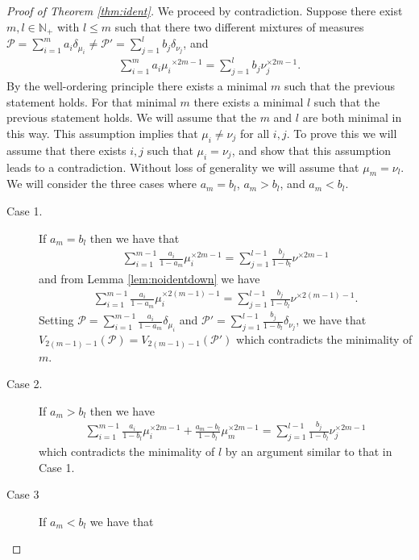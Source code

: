 \documentclass[aos,preprint]{imsart}
\def\sP{\mathscr{P}}
\theoremstyle{plain}
\theoremstyle{defintion}
\begin{document}
	\begin{proof}[Proof of Theorem \ref{thm:ident}]
		We proceed by contradiction. Suppose there exist $m,l\in \mathbb{N}_+$ with $l\le m$ such that there two different mixtures of measures $\sP = \sum_{i=1}^m a_i\delta_{\mu_i}  \neq \sP' = \sum_{j=1}^l b_j\delta_{\nu_j}$, and
		\begin{eqnarray} 
			\sum_{i=1}^{m} a_i {\mu_i}^{\times 2m-1} = \sum_{j=1}^{l} b_j {\nu}_j^{\times 2m-1}. \label{grr}
		\end{eqnarray}
		By the well-ordering principle there exists a minimal $m$ such that the previous statement holds. For that minimal $m$ there exists a minimal $l$ such that the previous statement holds. We will assume that the $m$ and $l$ are both minimal in this way. This assumption implies that $\mu_i\neq \nu_j$ for all $i,j$. To prove this we will assume that there exists $i,j$ such that $\mu_i = \nu_j$, and show that this assumption leads to a contradiction. Without loss of generality we will assume that $\mu_m = \nu_l$. We will consider the three cases where $a_m=b_l$, $a_m>b_l$, and $a_m<b_l$.
		\begin{description}	
			\item[Case 1.] If $a_m = b_l$ then we have that
				\begin{eqnarray*}
					\sum_{i = 1}^{m-1}\frac{a_i}{1-a_m} \mu_i^{\times 2m-1} = \sum_{j=1}^{l-1}\frac{b_j}{1-b_l}\nu^{\times 2m-1}
				\end{eqnarray*}
				and from Lemma \ref{lem:noidentdown} we have
				\begin{eqnarray*}
					\sum_{i = 1}^{m-1}\frac{a_i}{1-a_m} \mu_i^{\times 2(m-1)-1} = \sum_{j=1}^{l-1}\frac{b_j}{1-b_l}\nu^{\times 2(m-1)-1}.
				\end{eqnarray*}
				Setting $\sP = \sum_{i=1}^{m-1} \frac{a_i}{1-a_m} \delta_{\mu_i}$ and $\sP' = \sum_{j=1}^{l-1} \frac{b_j}{1-b_l} \delta_{\nu_j}$, we have that $V_{2\left( m-1 \right) - 1} \left( \sP \right) = V_{2\left( m-1 \right)-1}\left( \sP' \right)$ which contradicts the minimality of $m$.
			\item[Case 2.]If $a_m >b_l$ then we have
				\begin{eqnarray*}
					\sum_{i=1}^{m-1} \frac{a_i}{1-b_l} \mu_i^{\times 2m-1} + \frac{a_m - b_l}{1-b_l}\mu_m^{\times 2m-1} = \sum_{j=1}^{l-1} \frac{b_j}{1-b_l}\nu_j^{\times 2m-1}
				\end{eqnarray*}
				which contradicts the minimality of $l$ by an argument similar to that in Case 1.
			\item[Case 3] If $a_m<b_l$ we have that

\end{description}
\end{proof}
\end{document}
